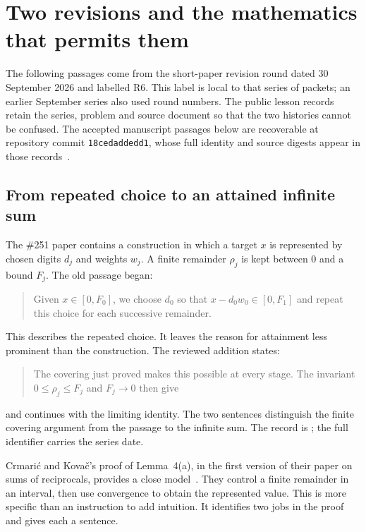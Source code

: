 \section{Two revisions and the mathematics that permits them}\label{sec:revisions}

The following passages come from the short-paper revision round dated
30 September 2026 and labelled R6. This label is local to that series of
packets; an earlier September series also used round numbers. The public
lesson records retain the series, problem and source document so that the
two histories cannot be confused. The accepted manuscript passages below
are recoverable at repository commit \texttt{18cedaddedd1}, whose full identity
and source digests appear in those records~\cite{ledger}.

\subsection{From repeated choice to an attained infinite sum}\label{sec:remainder}

The \#251 paper contains a construction in which a target $x$ is represented
by chosen digits $d_j$ and weights $w_j$. A finite remainder $\rho_j$ is kept
between $0$ and a bound $F_j$. The old passage began:
\begin{quote}
Given $x\in[0,F_0]$, we choose $d_0$ so that
$x-d_0w_0\in[0,F_1]$ and repeat this choice for each successive remainder.
\end{quote}
This describes the repeated choice. It leaves the reason for attainment less
prominent than the construction. The reviewed addition states:
\begin{quote}
The covering just proved makes this possible at every stage. The invariant
$0\le\rho_j\le F_j$ and $F_j\to0$ then give
\end{quote}
and continues with the limiting identity. The two sentences distinguish the
finite covering argument from the passage to the infinite sum. The record is
; the full identifier carries the series date.

Crmari\'c and Kova\v{c}'s proof of Lemma~4(a), in the first version of their
paper on sums of reciprocals, provides a close model~\cite[pp.~4--5]{crmaric}.
They control a finite remainder in an interval, then use convergence to obtain
the represented value. This is more specific than an instruction to add
intuition. It identifies two jobs in the proof and gives each a sentence.

